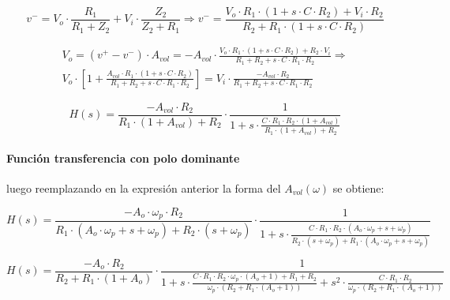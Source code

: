 \begin{equation*}
	v^{-} = V_o \cdot \frac{R_1}{R_1+ Z_2} + V_i \cdot \frac{Z_2}{Z_2 + R_1} \Rightarrow
	v^{-} = \frac{V_o \cdot R_1 \cdot ( 1 + s \cdot C \cdot R_2) + V_i \cdot R_2}{R_2 + R_1 \cdot (1 + s \cdot C \cdot R_2)}
\end{equation*}

\begin{align*}
	V_o = (v^{+} - v^{-}) \cdot A_{vol} = - A_{vol} \cdot \frac{V_o \cdot R_1 \cdot ( 1 + s \cdot C \cdot R_2) + R_2 \cdot V_i}{R_1 + R_2 + s \cdot C \cdot R_1 \cdot R_2} \Rightarrow \\
	V_o \cdot \left[ 1 + \frac{A_{vol} \cdot R_1 \cdot ( 1 + s \cdot C \cdot R_2)}{R_1 + R_2 + s \cdot C \cdot R_1 \cdot R_2} \right] =
	V_i \cdot \frac{-A_{vol} \cdot R_2}{R_1 + R_2 + s \cdot C \cdot R_1 \cdot R_2} 
\end{align*}

\begin{equation}
	H(s) = \frac{- A_{vol} \cdot R_2}{R_1 \cdot ( 1 + A_{vol} ) + R_2} \cdot \frac{1}{1 + s \cdot \frac{C \cdot R_1 \cdot R_2 \cdot ( 1 + A_{vol})}{R_1 \cdot (1 + A_{vol}) + R_2}}
	\label{eq:integrador_compensado_transfer_avol_finito}
\end{equation}

\paragraph*{Funci\'on transferencia con polo dominante} luego reemplazando en la expresi\'on anterior la forma del $A_{vol}(\omega)$ se obtiene:

\begin{equation*}
	H(s) = \frac{-A_o \cdot \omega_p \cdot R_2}{R_1 \cdot ( A_o \cdot \omega_p + s + \omega_p) + R_2 \cdot (s + \omega_p)} \cdot \frac{1}{1 + s \cdot \frac{C \cdot R_1 \cdot R_2 \cdot ( A_o \cdot \omega_p + s + \omega_p)}{R_2 \cdot ( s + \omega_p) + R_1 \cdot (A_o \cdot \omega_p + s + \omega_p)}}
\end{equation*}

\begin{equation}
	H(s) = \frac{-A_o \cdot R_2}{R_2 + R_1 \cdot (1+A_o)} \cdot \frac{1}{1 + s \cdot \frac{C \cdot R_1 \cdot R_2 \cdot \omega_p \cdot (A_o + 1) + R_1 + R_2}{\omega_p \cdot (R_2 + R_1 \cdot(A_o + 1))} + s^{2} \cdot \frac{C \cdot R_1 \cdot R_2}{\omega_p \cdot (R_2 + R_1 \cdot (A_o + 1))}}
	\label{eq:integrador_compensado_transfer_polo_dominante}
\end{equation}

